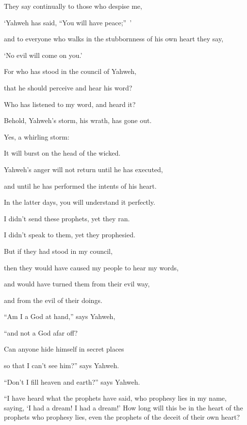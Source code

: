 {\par }{\Q {}They say continually to those who despise me,
\par }{\QB ‘Yahweh has said, “You will have peace;” ’
\par }{\Q and to everyone who walks in the stubbornness of his own heart they say,
\par }{\QB ‘No evil will come on you.’
\par }{\Q {}For who has stood in the council of Yahweh,
\par }{\QB that he should perceive and hear his word?
\par }{\QB Who has listened to my word, and heard it?
\par }{\Q {}Behold, Yahweh’s storm, his wrath, has gone out.
\par }{\QB Yes, a whirling storm:
\par }{\QB It will burst on the head of the wicked.
\par }{\Q {}Yahweh’s anger will not return until he has executed,
\par }{\QB and until he has performed the intents of his heart.
\par }{\QB In the latter days, you will understand it perfectly.
\par }{\Q {}I didn’t send these prophets, yet they ran.
\par }{\QB I didn’t speak to them, yet they prophesied.
\par }{\Q {}But if they had stood in my council,
\par }{\QB then they would have caused my people to hear my words,
\par }{\Q and would have turned them from their evil way,
\par }{\QB and from the evil of their doings.
\par }{\BB \par }{\Q {}“Am I a God at hand,” says Yahweh,
\par }{\QB “and not a God afar off?
\par }{\Q {}Can anyone hide himself in secret places
\par }{\QB so that I can’t see him?” says Yahweh.
\par }{\QB “Don’t I fill heaven and earth?” says Yahweh.
\par }{\PP {}“I have heard what the prophets have said, who prophesy lies in my name, saying, ‘I had a dream! I had a dream!’
How long will this be in the heart of the prophets who prophesy lies, even the prophets of the deceit of their own heart?
}
